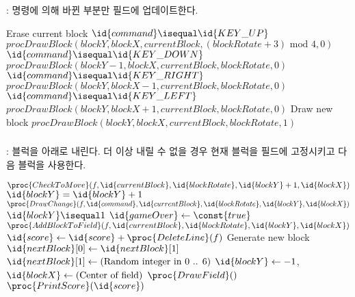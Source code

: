 \subsubsection{}: 명령에 의해 바뀐 부분만 필드에 업데이트한다.

\begin{codebox}
\li \Comment Erase current block
\li \If $\id{command} \isequal \id{KEY\_UP}$
\li \Then $proc{DrawBlock}(blockY, blockX, currentBlock, (blockRotate+3) \mbox{ mod } 4, 0)$ \End
\li \If $\id{command} \isequal \id{KEY\_DOWN}$
\li \Then $proc{DrawBlock}(blockY - 1, blockX, currentBlock, blockRotate, 0)$ \End
\li \If $\id{command} \isequal \id{KEY\_RIGHT}$
\li \Then $proc{DrawBlock}(blockY, blockX - 1, currentBlock, blockRotate, 0)$ \End
\li \If $\id{command} \isequal \id{KEY\_LEFT}$
\li \Then $proc{DrawBlock}(blockY, blockX + 1, currentBlock, blockRotate, 0)$ \End
\li \Comment Draw new block
\li $proc{DrawBlock}(blockY, blockX, currentBlock, blockRotate, 1)$
\end{codebox}

\newpage

\subsubsection{}: 블럭을 아래로 내린다. 더 이상 내릴 수 없을 경우 현재 블럭을 필드에 고정시키고 다음 블럭을 사용한다.

\begin{codebox}
\li \If $\proc{CheckToMove}(f, \id{currentBlock}, \id{blockRotate}, \id{blockY} + 1, \id{blockX})$
\li \Then
        $\id{blockY} = \id{blockY} + 1$
\li     $\proc{DrawChange}(f, \id{command}, \id{currentBlock}, \id{blockRotate}, \id{blockY}, \id{blockX})$
\li \Else
\li     \If $\id{blockY} \isequal 1$
\li     \Then
            $\id{gameOver} \gets \const{true}$
\li     \Else
\li         $\proc{AddBlockToField}(f, \id{currentBlock}, \id{blockRotate}, \id{blockY}, \id{blockX})$
\li         $\id{score} \gets \id{score} + \proc{DeleteLine}(f)$
\li         \Comment Generate new block
\li         $\id{nextBlock}[0] \gets \id{nextBlock}[1]$
\li         $\id{nextBlock}[1] \gets (\mbox{Random integer in 0 .. 6})$
\li         $\id{blockY} \gets -1$, $\id{blockX} \gets (\mbox{Center of field})$
\li         $\proc{DrawField}()$
\li         $\proc{PrintScore}(\id{score})$
        \End
    \End
\end{codebox}

